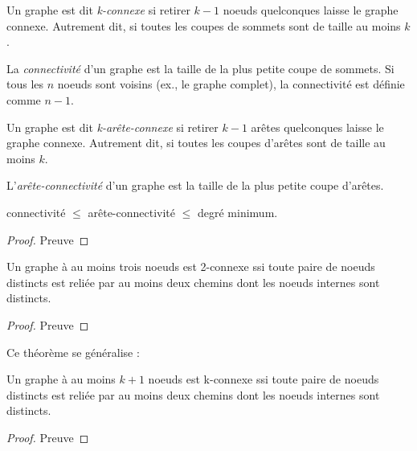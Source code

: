 \begin{mydef}
  Un graphe est dit \emph{k-connexe} si retirer $k − 1$ noeuds quelconques laisse le graphe connexe. Autrement dit, si toutes les coupes de sommets sont de taille au moins $k$.
\end{mydef}

\begin{mydef}
   La \emph{connectivité} d’un graphe est la taille de la plus petite coupe de sommets. Si tous les $n$ noeuds sont voisins (ex., le graphe complet), la connectivité est définie comme $n − 1$.
\end{mydef}

\begin{mydef}
   Un graphe est dit \emph{k-arête-connexe} si retirer $k − 1$ arêtes quelconques laisse le graphe connexe. Autrement dit, si toutes les coupes d’arêtes sont de taille au moins $k$.
\end{mydef}

\begin{mydef}
   L’\emph{arête-connectivité} d’un graphe est la taille de la plus petite coupe d’arêtes.
\end{mydef}

\begin{mytheo}  
  connectivité $\leq$ arête-connectivité $\leq$ degré minimum. %
  \begin{proof}
     Preuve
  \end{proof}
\end{mytheo}

\begin{mytheo}  
  Un graphe à au moins trois noeuds est 2-connexe ssi toute paire de noeuds distincts est reliée par au moins deux chemins dont les noeuds internes sont distincts.
  \begin{proof}
     Preuve
  \end{proof}
\end{mytheo}

Ce théorème se généralise :

\begin{mytheo}  
  Un graphe à au moins $k + 1$ noeuds est k-connexe ssi toute paire de noeuds distincts est reliée par au moins deux chemins dont les noeuds internes sont distincts.
  \begin{proof}
     Preuve
  \end{proof}
\end{mytheo}

